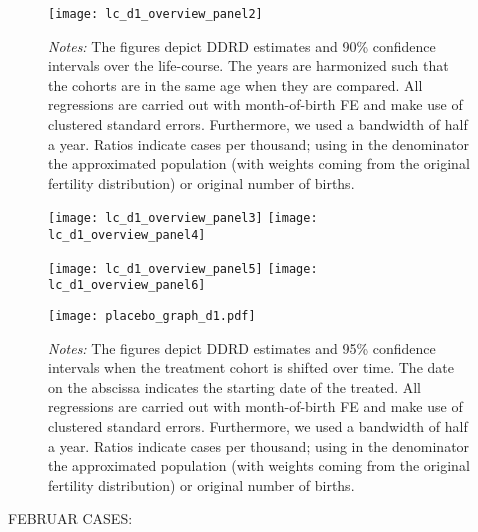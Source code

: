 \begin{landscape}
\begin{figure}[H]
\centering
\begin{minipage}{.9\linewidth}
\texttt{[image: lc\_d1\_overview\_panel2]}
{\scriptsize \emph{Notes:} The figures depict DDRD estimates and 90\% confidence intervals over the life-course. The years are harmonized such that the cohorts are in the same age when they are compared. All regressions are carried out with month-of-birth FE and make use of clustered standard errors. Furthermore, we used a bandwidth of half a year. Ratios indicate cases per thousand; using in the denominator the approximated population (with weights coming from the original fertility distribution) or original number of births. \par}
\end{minipage}
\end{figure}
\end{landscape}
\begin{figure}[H]%
	\centering
	\texttt{[image: lc\_d1\_overview\_panel3]}
	\texttt{[image: lc\_d1\_overview\_panel4]}
\end{figure}
\begin{figure}[H]
	\centering	
	\texttt{[image: lc\_d1\_overview\_panel5]}
	\texttt{[image: lc\_d1\_overview\_panel6]}
\end{figure}

\newpage
\begin{landscape}
\begin{figure}[H]
	\centering
    \begin{minipage}{.9\linewidth}
	\texttt{[image: placebo\_graph\_d1.pdf]}
    {\scriptsize \emph{Notes:} The figures depict DDRD estimates and 95\% confidence intervals when the treatment cohort is shifted over time. The date on the abscissa indicates the starting date of the treated.  All regressions are carried out with month-of-birth FE and make use of clustered standard errors. Furthermore, we used a bandwidth of half a year. Ratios indicate cases per thousand; using in the denominator the approximated population (with weights coming from the original fertility distribution) or original number of births. \par}
    \end{minipage}
\end{figure}
\end{landscape}



\begin{landscape}

\end{landscape}
\begin{landscape}

\end{landscape}
\newpage
FEBRUAR CASES:


